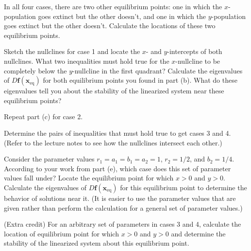 \documentclass[boxes]{gsypset}
\begin{document}
\begin{problem}
\begin{subproblems}
\begin{solution}
				\end{solution}
			\subproblem 
				In all four cases, there are two other equilibrium points: 
				one in which the $x$-population goes extinct but the other doesn't, and 
				one in which the $y$-population goes extinct but the other doesn't.  
				Calculate the locations of these two equilibrium points.
				\begin{solution}
					
				\end{solution}
			\subproblem 
				Sketch the nullclines for case 1 and locate the $x$- and $y$-intercepts of both nullclines.  
				What two inequalities must hold true for the $x$-nullcline to be 
				completely below the $y$-nullcline in the first quadrant?  
				Calculate the eigenvalues of $D\mathbf{f}(\mathbf{x}_{\text{eq}})$ 
				for both equilibrium points you found in part (b). 
				What do these eigenvalues tell you about the stability of the linearized system 
				near these equilibrium points?
				\begin{solution}
					
				\end{solution}
			\subproblem Repeat part (c) for case 2.
				\begin{solution}
					
				\end{solution}
			\subproblem 
				Determine the pairs of inequalities that must hold true to get cases 3 and 4. 
				(Refer to the lecture notes to see how the nullclines intersect each other.)
				\begin{solution}
					
				\end{solution}
			\subproblem 
				Consider the parameter values $r_1=a_1=b_1=a_2=1$, $r_2=1/2$, and $b_2=1/4$. 
				According to your work from part (e), 
				which case does this set of parameter values fall under? 
				Locate the equilibrium point for which $x>0$ and $y>0$. 
				Calculate the eigenvalues of $D\mathbf{f}(\mathbf{x}_{\text{eq}})$ for this equilibrium point 
				to determine the behavior of solutions near it. 
				(It is easier to use the parameter values that are given 
				rather than perform the calculation for a general set of parameter values.)
				\begin{solution}
					
				\end{solution}
			\subproblem (Extra credit) 
				For an arbitrary set of parameters in cases 3 and 4, 
				calculate the location of equilibrium point for which $x>0$ and $y>0$ and 
				determine the stability of the linearized system about this equilibrium point.
				\begin{solution}
					
				\end{solution}
		\end{subproblems}
	\end{problem}
\end{document}
